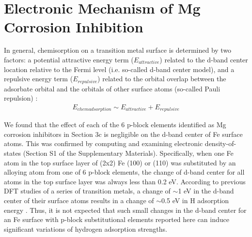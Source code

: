 \section{Electronic Mechanism of Mg Corrosion Inhibition}

In general, chemisorption on a transition metal surface is determined by two factors: a potential attractive energy term ($E_{attractive}$) related to the d-band center location relative to the Fermi level (i.e. so-called d-band center model), and a repulsive energy term ($E_{repulsive}$) related to the orbital overlap between the adsorbate orbital and the orbitals of other surface atoms (so-called Pauli repulsion) \cite{hammer1995electronic,hammer1995gold}:
\begin{align}
E_{chem adsorption} \sim E_{attractive} + E_{repulsive}
\label{Chap:Mg_H:eq:electronic}
\end{align}

We found that the effect of each of the 6 p-block elements identified as Mg corrosion inhibitors in Section 3c is negligible on the d-band center of Fe surface atoms. This was confirmed by computing and examining electronic density-of-states (Section S1 of the Supplementary Materials). Specifically, when one Fe atom in the top surface layer of (2x2) Fe (100) or (110) was substituted by an alloying atom from one of 6 p-block elements, the change of d-band center for all atoms in the top surface layer was always less than 0.2 eV. According to previous DFT studies of a series of transition metals, a change of $\sim$1 eV in the d-band center of their surface atoms results in a change of $\sim$0.5 eV in H adsorption energy \cite{greeley2006computational}. Thus, it is not expected that such small changes in the d-band center for an Fe surface with p-block substitutional elements reported here can induce significant variations of hydrogen adsorption strengths.

